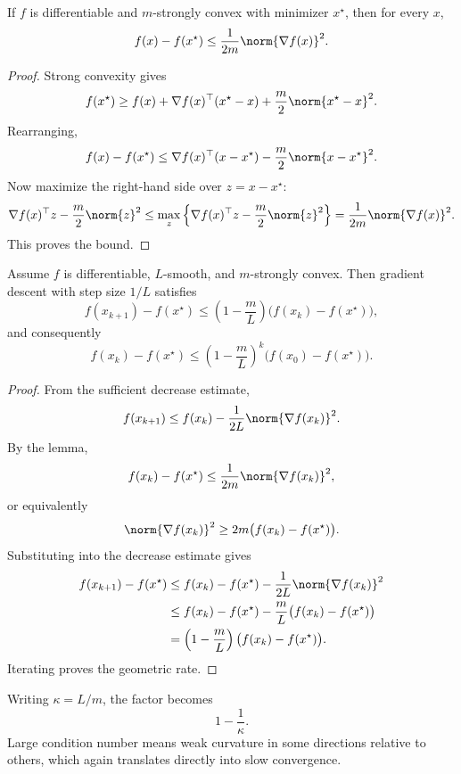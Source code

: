 \begin{lemma}\label{lem:l2-strong-convexity-implies-a-gradient-lower-bound}
	If $f$ is differentiable and $m$-strongly convex with minimizer $x^\star$, then for every $x$,
	\[
		f(x)-f(x^\star)\le \frac{1}{2m}\norm{\nabla f(x)}^2.
	\]
\end{lemma}
\begin{proof}
	Strong convexity gives
	\[
		f(x^\star)\ge f(x)+\nabla f(x)^\top(x^\star-x)+\frac{m}{2}\norm{x^\star-x}^2.
	\]
	Rearranging,
	\[
		f(x)-f(x^\star)\le \nabla f(x)^\top(x-x^\star)-\frac{m}{2}\norm{x-x^\star}^2.
	\]
	Now maximize the right-hand side over $z=x-x^\star$:
	\[
		\nabla f(x)^\top z-\frac{m}{2}\norm{z}^2
		\le
		\max_z \left\{\nabla f(x)^\top z-\frac{m}{2}\norm{z}^2\right\}
		=
		\frac{1}{2m}\norm{\nabla f(x)}^2.
	\]
	This proves the bound.
\end{proof}

\begin{theorem}\label{thm:l2-linear-convergence-for-strongly-convex-smooth-functions}
	Assume $f$ is differentiable, $L$-smooth, and $m$-strongly convex. Then gradient descent with step size $1/L$ satisfies
	\[
		f(x_{k+1})-f(x^\star)
		\le
		\left(1-\frac{m}{L}\right)\bigl(f(x_k)-f(x^\star)\bigr),
	\]
	and consequently
	\[
		f(x_k)-f(x^\star)
		\le
		\left(1-\frac{m}{L}\right)^k \bigl(f(x_0)-f(x^\star)\bigr).
	\]
\end{theorem}
\begin{proof}
	From the sufficient decrease estimate,
	\[
		f(x_{k+1}) \le f(x_k)-\frac{1}{2L}\norm{\nabla f(x_k)}^2.
	\]
	By the lemma,
	\[
		f(x_k)-f(x^\star)\le \frac{1}{2m}\norm{\nabla f(x_k)}^2,
	\]
	or equivalently
	\[
		\norm{\nabla f(x_k)}^2 \ge 2m\bigl(f(x_k)-f(x^\star)\bigr).
	\]
	Substituting into the decrease estimate gives
	\begin{align*}
		f(x_{k+1})-f(x^\star)
		 & \le f(x_k)-f(x^\star)-\frac{1}{2L}\norm{\nabla f(x_k)}^2 \\
		 & \le f(x_k)-f(x^\star)-\frac{m}{L}\bigl(f(x_k)-f(x^\star)\bigr) \\
		 & = \left(1-\frac{m}{L}\right)\bigl(f(x_k)-f(x^\star)\bigr).
	\end{align*}
	Iterating proves the geometric rate.
\end{proof}

\begin{remark}
	Writing $\kappa=L/m$, the factor becomes
	\[
		1-\frac{1}{\kappa}.
	\]
	Large condition number means weak curvature in some directions relative to others, which again translates directly into slow convergence.
\end{remark}

